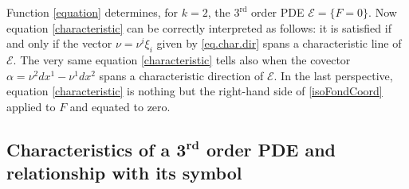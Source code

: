 \documentclass[10pt,a4paper]{amsart}
\newcommand{\E}{\mathcal{E}}
\newcommand{\Rd}{^\textrm{rd}}
\newcommand{\w}{\nu}
\numberwithin{equation}{section}
\begin{document}
\begin{Example}\label{exCharCoord}
Function \eqref{equation} determines, for $k=2$, the $3\Rd$ order PDE $\E=\{F=0\}$. Now equation \eqref{characteristic} can be correctly interpreted as follows: it is satisf\/ied if and only if the vector $\w=\w^i\xi_i$ given by \eqref{eq.char.dir} spans a characteristic line of $\E$. The very same equation \eqref{characteristic} tells also when the covector $\alpha=\w^2dx^1-\w^1dx^2$ spans a characteristic direction of $\E$. In the last perspective, equation \eqref{characteristic} is nothing but the right-hand side of \eqref{isoFondCoord} applied to $F$ and equated to zero.
\end{Example}

\subsection[Characteristics of a $3\Rd$ order PDE and relationship with its symbol]{Characteristics of a $\boldsymbol{3\Rd}$ order PDE and relationship with its symbol}\label{subsubDefPDE}
\end{document}
